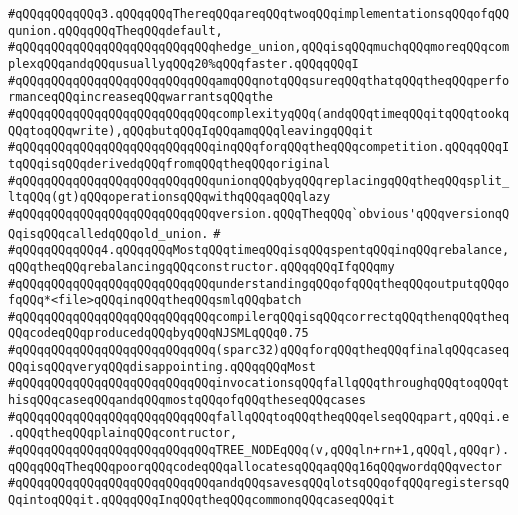 \verb|#qQQqqQQqqQQq3.qQQqqQQqThereqQQqareqQQqtwoqQQqimplementationsqQQqofqQQqunion.qQQqqQQqTheqQQqdefault,|\newline
\verb|#qQQqqQQqqQQqqQQqqQQqqQQqqQQqhedge_union,qQQqisqQQqmuchqQQqmoreqQQqcomplexqQQqandqQQqusuallyqQQq20%qQQqfaster.qQQqqQQqI|\newline
\verb|#qQQqqQQqqQQqqQQqqQQqqQQqqQQqamqQQqnotqQQqsureqQQqthatqQQqtheqQQqperformanceqQQqincreaseqQQqwarrantsqQQqthe|\newline
\verb|#qQQqqQQqqQQqqQQqqQQqqQQqqQQqcomplexityqQQq(andqQQqtimeqQQqitqQQqtookqQQqtoqQQqwrite),qQQqbutqQQqIqQQqamqQQqleavingqQQqit|\newline
\verb|#qQQqqQQqqQQqqQQqqQQqqQQqqQQqinqQQqforqQQqtheqQQqcompetition.qQQqqQQqItqQQqisqQQqderivedqQQqfromqQQqtheqQQqoriginal|\newline
\verb|#qQQqqQQqqQQqqQQqqQQqqQQqqQQqunionqQQqbyqQQqreplacingqQQqtheqQQqsplit_ltqQQq(gt)qQQqoperationsqQQqwithqQQqaqQQqlazy|\newline
\verb|#qQQqqQQqqQQqqQQqqQQqqQQqqQQqversion.qQQqTheqQQq`obvious'qQQqversionqQQqisqQQqcalledqQQqold_union.|\newline
\verb|#|\newline
\verb|#qQQqqQQqqQQq4.qQQqqQQqMostqQQqtimeqQQqisqQQqspentqQQqinqQQqrebalance,qQQqtheqQQqrebalancingqQQqconstructor.qQQqqQQqIfqQQqmy|\newline
\verb|#qQQqqQQqqQQqqQQqqQQqqQQqqQQqunderstandingqQQqofqQQqtheqQQqoutputqQQqofqQQq*<file>qQQqinqQQqtheqQQqsmlqQQqbatch|\newline
\verb|#qQQqqQQqqQQqqQQqqQQqqQQqqQQqcompilerqQQqisqQQqcorrectqQQqthenqQQqtheqQQqcodeqQQqproducedqQQqbyqQQqNJSMLqQQq0.75|\newline
\verb|#qQQqqQQqqQQqqQQqqQQqqQQqqQQq(sparc32)qQQqforqQQqtheqQQqfinalqQQqcaseqQQqisqQQqveryqQQqdisappointing.qQQqqQQqMost|\newline
\verb|#qQQqqQQqqQQqqQQqqQQqqQQqqQQqinvocationsqQQqfallqQQqthroughqQQqtoqQQqthisqQQqcaseqQQqandqQQqmostqQQqofqQQqtheseqQQqcases|\newline
\verb|#qQQqqQQqqQQqqQQqqQQqqQQqqQQqfallqQQqtoqQQqtheqQQqelseqQQqpart,qQQqi.e.qQQqtheqQQqplainqQQqcontructor,|\newline
\verb|#qQQqqQQqqQQqqQQqqQQqqQQqqQQqTREE_NODEqQQq(v,qQQqln+rn+1,qQQql,qQQqr).qQQqqQQqTheqQQqpoorqQQqcodeqQQqallocatesqQQqaqQQq16qQQqwordqQQqvector|\newline
\verb|#qQQqqQQqqQQqqQQqqQQqqQQqqQQqandqQQqsavesqQQqlotsqQQqofqQQqregistersqQQqintoqQQqit.qQQqqQQqInqQQqtheqQQqcommonqQQqcaseqQQqit|\newline
